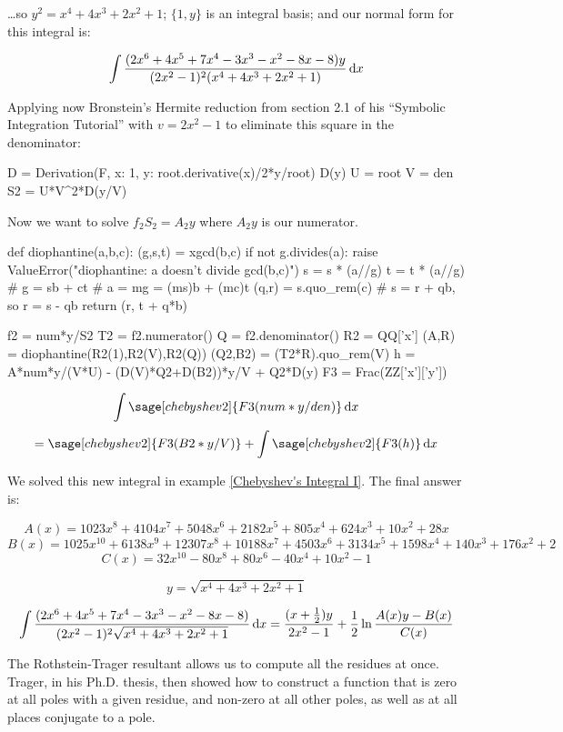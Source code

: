 \ldots so $y^2 = x^4+4 x^3+2 x^2+1$; $\{1, y\}$ is an integral basis;
and our normal form for this integral is:

$$\int {{(2x^6+4x^5+7x^4-3x^3-x^2-8x-8)y}\over{(2x^2-1)^2(x^4+4 x^3+2 x^2+1)}} \,{\rm d}x$$

Applying now Bronstein's Hermite reduction from
section 2.1 of his ``Symbolic Integration Tutorial'' with $v=2x^2-1$
to eliminate this square in the denominator:

\begin{sageblock}[chebyshev2]
D = Derivation(F, {x: 1, y: root.derivative(x)/2*y/root})
D(y)
U = root
V = den
S2 = U*V^2*D(y/V)
\end{sageblock}
Now we want to solve $f_2 S_2 = A_2 y$ where $A_2 y$ is our numerator.

\begin{sageblock}[chebyshev2]
def diophantine(a,b,c):
   (g,s,t) = xgcd(b,c)
   if not g.divides(a):
      raise ValueError("diophantine: a doesn't divide gcd(b,c)")
   s = s * (a//g)
   t = t * (a//g)
   # g = sb + ct
   # a = mg = (ms)b + (mc)t
   (q,r) = s.quo_rem(c)
   # s = r + qb, so r = s - qb
   return (r, t + q*b)
\end{sageblock}

\begin{sageblock}[chebyshev2]
f2 = num*y/S2
T2 = f2.numerator()
Q = f2.denominator()
R2 = QQ['x']
(A,R) = diophantine(R2(1),R2(V),R2(Q))
(Q2,B2) = (T2*R).quo_rem(V)
h = A*num*y/(V*U) - (D(V)*Q2+D(B2))*y/V + Q2*D(y)
F3 = Frac(ZZ['x']['y'])
\end{sageblock}

$$\int \sage[chebyshev2]{F3(num*y/den)}\,{\rm d}x$$
$$=\sage[chebyshev2]{F3(B2*y/V)} + \int \sage[chebyshev2]{F3(h)}\,{\rm d}x$$

We solved this new integral in example \ref{Chebyshev's Integral I}.
The final answer is:

$$A(x) = 1023x^8+4104x^7+5048x^6+2182x^5+805x^4+624x^3+10x^2+28x$$
$$B(x) = 1025x^{10} + 6138x^9 + 12307x^8 + 10188x^7 + 4503x^6 + 3134x^5 + 1598x^4 + 140x^3 + 176x^2 +2$$
$$C(x) = 32x^{10}-80x^8+80x^6-40x^4+10x^2-1$$

$$y = \sqrt{x^4+4 x^3+2 x^2+1}$$

$$\int {{(2x^6+4x^5+7x^4-3x^3-x^2-8x-8)}\over{(2x^2-1)^2\sqrt{x^4+4 x^3+2 x^2+1}}} \,{\rm d}x
= {{(x+{1\over2})y}\over{2x^2-1}} + {1\over2}\ln{{A(x)y - B(x)}\over{C(x)}}
$$

\endexample


\vfill\eject
{}

The Rothstein-Trager resultant allows us to compute all the residues
at once.  Trager, in his Ph.D. thesis, then showed how to construct a
function that is zero at all poles with a given residue, and non-zero
at all other poles, as well as at all places conjugate to a pole.
